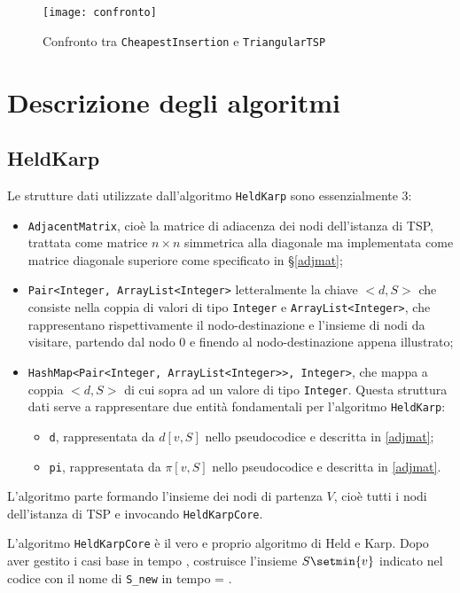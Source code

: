 \begin{figure}[H]
	\centering
	\texttt{[image: confronto]}
	\caption{Confronto tra \texttt{CheapestInsertion} e \texttt{TriangularTSP}}
	\label{confronto}
\end{figure}

\newpage
\section{Descrizione degli algoritmi}
\subsection{HeldKarp}
Le strutture dati utilizzate dall'algoritmo \texttt{HeldKarp} sono essenzialmente 3:
\begin{itemize}
	\item \texttt{AdjacentMatrix}, cioè la matrice di adiacenza dei nodi dell'istanza di TSP, trattata come matrice $n\times n$ simmetrica alla diagonale ma implementata come matrice diagonale superiore come specificato in \S\ref{adjmat};
	\item \texttt{Pair<Integer, ArrayList<Integer>} letteralmente la chiave $<\!\!d,S\!\!>$ che consiste nella coppia di valori di tipo \texttt{Integer} e \texttt{ArrayList<Integer>}, che rappresentano rispettivamente il nodo-destinazione e l'insieme di nodi da visitare, partendo dal nodo 0 e finendo al nodo-destinazione appena illustrato;
	\item \texttt{HashMap<Pair<Integer, ArrayList<Integer>>, Integer>}, che mappa a coppia $<\!\!d,S\!\!>$ di cui sopra ad un valore di tipo \texttt{Integer}. Questa struttura dati serve a rappresentare due entità fondamentali per l'algoritmo \texttt{HeldKarp}:
	\begin{itemize}
		\item \texttt{d}, rappresentata da $d[v,S]$ nello pseudocodice e descritta in \ref{adjmat};
		\item \texttt{pi}, rappresentata da $\pi[v,S]$ nello pseudocodice e descritta in \ref{adjmat}.
	\end{itemize}
\end{itemize}

L'algoritmo parte formando l'insieme dei nodi di partenza $V$, cioè tutti i nodi dell'istanza di TSP e invocando \texttt{HeldKarpCore}.\eqcapo

L'algoritmo \texttt{HeldKarpCore} è il vero e proprio algoritmo di Held e Karp. Dopo aver gestito i casi base in tempo , costruisce l'insieme $S\setmin \{v\}$ indicato nel codice con il nome di \texttt{S\_new} in tempo  = .\eqcapo

